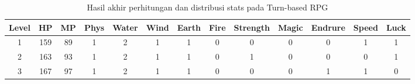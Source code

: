 \begin{sidewaystable}
	\centering
	\caption{Hasil akhir perhitungan dan distribusi stats pada Turn-based RPG}
	\label{tb: result_player_stats_turn-based}
	\begin{tabular}{|c|c|c|c|c|c|c|c|c|c|c|c|c|}
		\hline
		\rowcolor[HTML]{C0C0C0} 
		\textbf{Level}                                    & \textbf{HP}                                       & \textbf{MP}                                       & \textbf{Phys}                                     & \textbf{Water}                                    & \textbf{Wind}                                     & \textbf{Earth}                                    & \textbf{Fire}                                     & \textbf{Strength}                                 & \textbf{Magic}                                    & \textbf{Endrure}                                  & \textbf{Speed}                                    & \textbf{Luck}                                     \\ \hline
		1                                                 & 159                                               & 89                                                & 1                                                 & 2                                                 & 1                                                 & 1                                                 & 0                                                 & 0                                                 & 0                                                 & 0                                                 & 1                                                 & 1                                                 \\ \hline
		2                                                 & 163                                               & 93                                                & 1                                                 & 2                                                 & 1                                                 & 1                                                 & 0                                                 & 1                                                 & 0                                                 & 0                                                 & 0                                                 & 1                                                 \\ \hline
		3                                                 & 167                                               & 97                                                & 1                                                 & 2                                                 & 1                                                 & 1                                                 & 0                                                 & 0                                                 & 0                                                 & 1                                                 & 1                                                 & 0                                                 \\ \hline

\end{tabular}
\end{sidewaystable}
